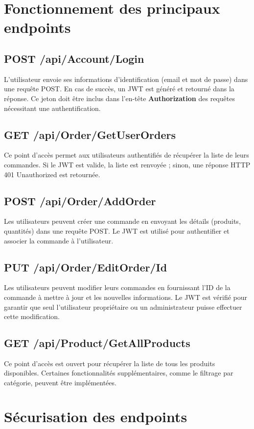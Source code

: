 \section{Fonctionnement des principaux endpoints}

\subsection*{POST /api/Account/Login}
L'utilisateur envoie ses informations d'identification (email et mot de passe) dans une requête POST. En cas de succès, un JWT est généré et retourné dans la réponse. Ce jeton doit être inclus dans l'en-tête \textbf{Authorization} des requêtes nécessitant une authentification.

\subsection*{GET /api/Order/GetUserOrders}
Ce point d'accès permet aux utilisateurs authentifiés de récupérer la liste de leurs commandes. Si le JWT est valide, la liste est renvoyée ; sinon, une réponse HTTP 401 Unauthorized est retournée.

\subsection*{POST /api/Order/AddOrder}
Les utilisateurs peuvent créer une commande en envoyant les détails (produits, quantités) dans une requête POST. Le JWT est utilisé pour authentifier et associer la commande à l'utilisateur.

\subsection*{PUT /api/Order/EditOrder/{Id}}
Les utilisateurs peuvent modifier leurs commandes en fournissant l'ID de la commande à mettre à jour et les nouvelles informations. Le JWT est vérifié pour garantir que seul l'utilisateur propriétaire ou un administrateur puisse effectuer cette modification.

\subsection*{GET /api/Product/GetAllProducts}
Ce point d'accès est ouvert pour récupérer la liste de tous les produits disponibles. Certaines fonctionnalités supplémentaires, comme le filtrage par catégorie, peuvent être implémentées.

\section{Sécurisation des endpoints}

